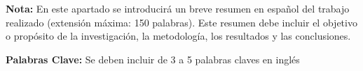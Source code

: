 {\bf Nota:} En este apartado se introducirá un breve resumen en español 
del trabajo realizado (extensión máxima: 150 palabras). Este resumen 
debe incluir el objetivo o propósito de la investigación, la metodología, 
los resultados y las conclusiones.

{\bf Palabras Clave:} Se deben incluir de 3 a 5 palabras claves en inglés
